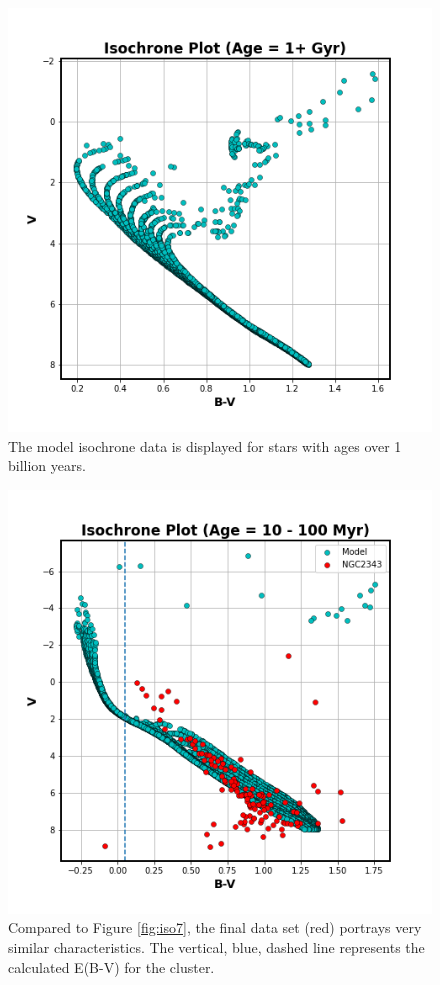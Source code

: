 \documentclass[linenumbers]{aastex631}
\begin{document}
\begin{figure}
    \centering
    \includegraphics[scale = 0.5]{pngs/iso9.png}
    \caption{\label{fig:iso9} The model isochrone data is displayed for stars with ages over 1 billion years.}
    \label{fig:iso9}
\end{figure}

\begin{figure}
    \centering
    \includegraphics[scale = 0.5]{pngs/model_fit.png}
    \caption{\label{fig:model} Compared to Figure \ref{fig:iso7}, the final data set (red) portrays very similar characteristics. The vertical, blue, dashed line represents the calculated E(B-V) for the cluster. }
    \label{fig:model}
\end{figure}
\end{document}
